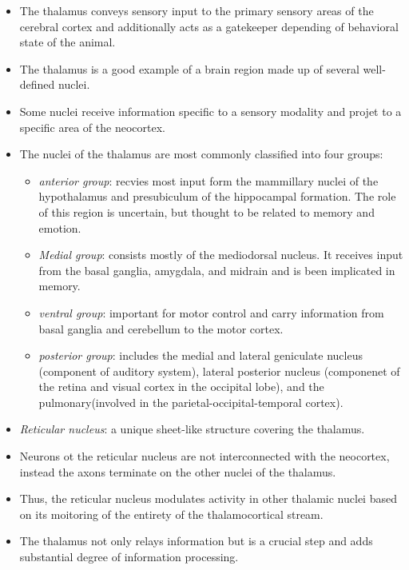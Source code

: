 \documentclass[12pt,a4paper]{article}
\begin{document}
\begin{itemize}
    \item The thalamus conveys sensory input to the primary sensory areas of the cerebral cortex and additionally acts as a gatekeeper depending of behavioral state of the animal.
    \item The thalamus is a good example of a brain region made up of several well-defined nuclei.
    \item Some nuclei receive information specific to a sensory modality and projet to a specific area of the neocortex.
    \item The nuclei of the thalamus are most commonly classified into four groups:
        \begin{itemize}
            \item \textit{anterior group}: recvies most input form the mammillary nuclei of the hypothalamus and presubiculum of the hippocampal formation. The role of this region is uncertain, but thought to be related to memory and emotion.
            \item \textit{Medial group}: consists mostly of the mediodorsal nucleus. It receives input from the basal ganglia, amygdala, and midrain and is been implicated in memory.
            \item \textit{ventral group}: important for motor control and carry information from basal ganglia and cerebellum to the motor cortex.
            \item \textit{posterior group}: includes the medial and lateral geniculate nucleus (component of auditory system), lateral posterior nucleus (componenet of the retina and visual cortex in the occipital lobe), and the pulmonary(involved in the parietal-occipital-temporal cortex).
        \end{itemize}
    \item \textit{Reticular nucleus}: a unique sheet-like structure covering the thalamus.
    \item Neurons ot the reticular nucleus are not interconnected with the neocortex, instead the axons terminate on the other nuclei of the thalamus.
    \item Thus, the reticular nucleus modulates activity in other thalamic nuclei based on its moitoring of the entirety of the thalamocortical stream.
    \item The thalamus not only relays information but is a crucial step and adds substantial degree of information processing.
\end{itemize}
\end{document}
